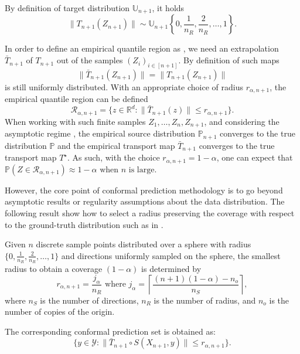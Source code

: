 By definition of target distribution $\mathbb{U}_{n+1}$, it holds 
\begin{equation}\label{eq:distribution_empirical_transport}
\|T_{n+1}(Z_{n+1})\| \sim \mathbb{U}_{n+1} \left\{0, \frac{1}{n_R}, \frac{2}{n_R}, \ldots, 1\right\}.
\end{equation}


In order to define an empirical quantile region as , we need an extrapolation $\bar{T}_{n+1}$ of $T_{n+1}$ out of the samples $(Z_i)_{i\in [n+1]}$. By definition of such maps $$\|\bar{T}_{n+1}(Z_{n+1})\|= \|T_{n+1}(Z_{n+1})\|$$ is still uniformly distributed. With an appropriate choice of radius $r_{\alpha, n+1}$, the empirical quantile region can be defined 
$$
\mathcal{R}_{\alpha, n+1} = \{z \in \mathbb{R}^d: \|\bar{T}_{n+1}(z)\| \leq r_{\alpha, n+1}\}.
$$
When working with such finite samples $Z_1, \ldots, Z_n, Z_{n+1}$, and considering the asymptotic regime \citep{chewi2024statistical, hallin2021}, the empirical source distribution $\mathbb{P}_{n+1}$ converges to the true distribution $\mathbb{P}$ and the empirical transport map $\bar T_{n+1}$ converges to the true transport map $T^\star$. As such, with the choice $r_{\alpha, n+1}= 1-\alpha$, one can expect that
$
\mathbb{P} \left(Z \in \mathcal{R}_{\alpha, n+1}\right)  \approx 1 - \alpha \text{ when } n \text{ is large}.
$

However, the core point of conformal prediction methodology is to go beyond asymptotic results or regularity assumptions about the data distribution. The following result show how to select a radius preserving the coverage with respect to the ground-truth distribution such as in . 
\begin{proposition}
Given $n$ discrete sample points distributed over a sphere with radius $\{0, \frac{1}{n_R}, \frac{2}{n_R}, \ldots, 1\}$ and directions uniformly sampled on the sphere, the smallest radius to obtain a coverage $(1-\alpha)$ is 
determined by 
$$r_{\alpha, n+1} = \frac{j_\alpha}{n_R} \text{ where }
j_\alpha = \left\lceil \frac{(n+1) (1 - \alpha) - n_o}{n_S} \right\rceil,
$$
where $n_S$ is the number of directions, $n_R$ is the number of radius, and $n_o$ is the number of copies of the origin.
\end{proposition}

The corresponding conformal prediction set is obtained as:
\begin{equation}\label{eq:full_transport_otcp}
\{y \in \mathcal{Y}: \|\bar T_{n+1} \circ S(X_{n+1}, y)\| \leq r_{\alpha, n+1}\}.
\end{equation}

